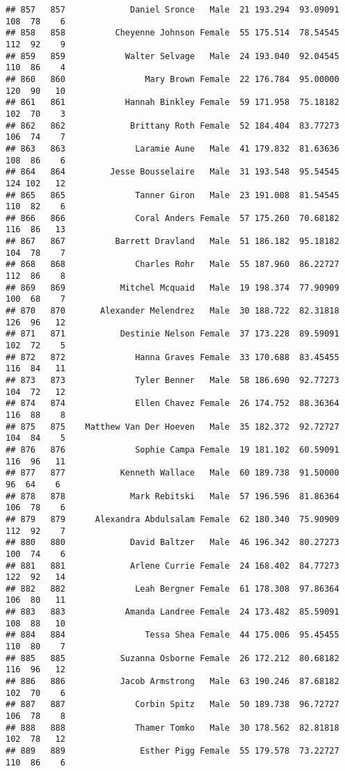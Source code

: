 \documentclass[
]{article}
\begin{document}
\begin{verbatim}
## 857   857             Daniel Sronce   Male  21 193.294  93.09091 108  78    6
## 858   858          Cheyenne Johnson Female  55 175.514  78.54545 112  92    9
## 859   859            Walter Selvage   Male  24 193.040  92.04545 110  86    4
## 860   860                Mary Brown Female  22 176.784  95.00000 120  90   10
## 861   861            Hannah Binkley Female  59 171.958  75.18182 102  70    3
## 862   862             Brittany Roth Female  52 184.404  83.77273 106  74    7
## 863   863              Laramie Aune   Male  41 179.832  81.63636 108  86    6
## 864   864         Jesse Bousselaire   Male  31 193.548  95.54545 124 102   12
## 865   865              Tanner Giron   Male  23 191.008  81.54545 110  82    6
## 866   866              Coral Anders Female  57 175.260  70.68182 116  86   13
## 867   867          Barrett Dravland   Male  51 186.182  95.18182 104  78    7
## 868   868              Charles Rohr   Male  55 187.960  86.22727 112  86    8
## 869   869           Mitchel Mcquaid   Male  19 198.374  77.90909 100  68    7
## 870   870       Alexander Melendrez   Male  30 188.722  82.31818 126  96   12
## 871   871           Destinie Nelson Female  37 173.228  89.59091 102  72    5
## 872   872              Hanna Graves Female  33 170.688  83.45455 116  84   11
## 873   873              Tyler Benner   Male  58 186.690  92.77273 104  72   12
## 874   874              Ellen Chavez Female  26 174.752  88.36364 116  88    8
## 875   875    Matthew Van Der Hoeven   Male  35 182.372  92.72727 104  84    5
## 876   876              Sophie Campa Female  19 181.102  60.59091 116  96   11
## 877   877           Kenneth Wallace   Male  60 189.738  91.50000  96  64    6
## 878   878             Mark Rebitski   Male  57 196.596  81.86364 106  78    6
## 879   879      Alexandra Abdulsalam Female  62 180.340  75.90909 112  92    7
## 880   880             David Baltzer   Male  46 196.342  80.27273 100  74    6
## 881   881             Arlene Currie Female  24 168.402  84.77273 122  92   14
## 882   882              Leah Bergner Female  61 178.308  97.86364 106  80   11
## 883   883            Amanda Landree Female  24 173.482  85.59091 108  88   10
## 884   884                Tessa Shea Female  44 175.006  95.45455 110  80    7
## 885   885           Suzanna Osborne Female  26 172.212  80.68182 116  96   12
## 886   886           Jacob Armstrong   Male  63 190.246  87.68182 102  70    6
## 887   887              Corbin Spitz   Male  50 189.738  96.72727 106  78    8
## 888   888              Thamer Tomko   Male  30 178.562  82.81818 102  78   12
## 889   889               Esther Pigg Female  55 179.578  73.22727 110  86    6

\end{verbatim}
\end{document}

